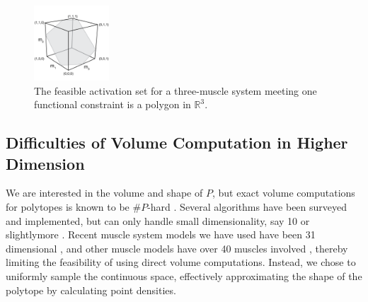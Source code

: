 \begin{figure}[ht]
  \label{fig:fig_hr}
   \begin{center}
    \includegraphics[width=0.25\textwidth]{sections/figs/feasibleactivation.png}
  \end{center}
  \caption{The feasible activation set for a  three-muscle system meeting one functional constraint is a polygon in $\mathbb{R}^3$.} %
\end{figure}

\subsection{Difficulties of Volume Computation in Higher Dimension}

We are interested in the volume and shape of $P$, but exact volume computations for polytopes is known to be $\#P$-hard \cite{Dyer}.
Several algorithms have been surveyed and implemented, but can only handle small dimensionality, say 10 or slightlymore \cite{Bueler2}.  
Recent muscle system models we have used have been 31 dimensional \cite{Valero-Cuevas2015high-dimensional}, and other muscle models have over 40 muscles involved \cite{arnold2010model, kutch2012challenges, hamner2010muscle, de2014human}, thereby limiting the feasibility of using direct volume computations. Instead, we chose to uniformly sample the continuous space, effectively approximating the shape of the polytope by calculating point densities. %

